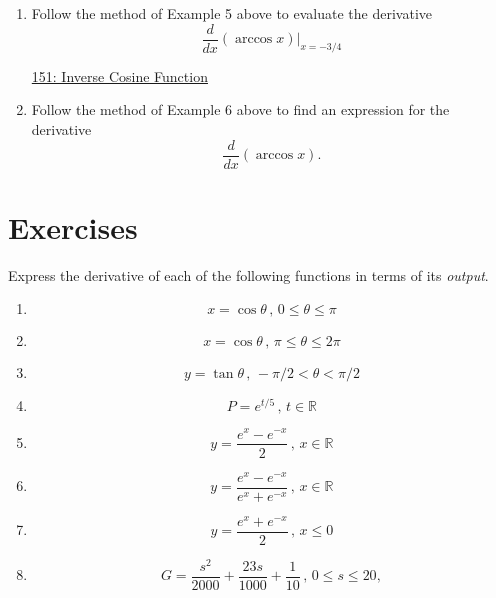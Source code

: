 \documentclass{ximera}
\begin{document}
\begin{exercise} \label{EODFerDFghg}
\begin{enumerate}

\item Follow the method of Example 5 above to evaluate the derivative 
\[
        \frac{d}{dx} \left( \arccos x  \right)\Big|_{x=-3/4}
\]

\begin{onlineOnly}
    \begin{center}
\end{center}
\end{onlineOnly}

\href{https://www.desmos.com/calculator/hgxqjixv4n}{151: Inverse Cosine Function}

\item Follow the method of Example 6 above to find an expression for the derivative
\[
   \frac{d}{dx} \left( \arccos x  \right) .
\]
\end{enumerate}

\end{exercise}

\section{Exercises}

\begin{exercise}  \label{Eggghhybvbxzzz}
Express the derivative of each of the following functions in terms of its \emph{output}.
\begin{enumerate}
\item 
\[
       x = \cos\theta \, , \, 0\leq \theta \leq \pi
\]


\item 
\[
       x = \cos\theta \, , \, \pi\leq \theta \leq 2\pi
\]

\item 
\[
       y = \tan\theta \, , \, -\pi/2 < \theta < \pi/2
\]

\item
\[
     P = e^{t/5} \, , \, t\in \mathbb{R} 
\]

\item 
\[
  y = \frac{e^x - e^{-x}}{2} \, , \, x\in \mathbb{R} 
\]

\item 
\[
  y = \frac{e^x - e^{-x}}{e^x + e^{-x}} \, , \, x\in \mathbb{R} 
\]

\item 
\[
  y = \frac{e^x+ e^{-x}}{2} \, , \, x \leq 0 
\]


\item
\[
   G = \frac{s^2}{2000} + \frac{23s}{1000} + \frac{1}{10} \, , \, 0\leq s\leq 20, 
\]

\end{enumerate}

\end{exercise}
\end{document}
